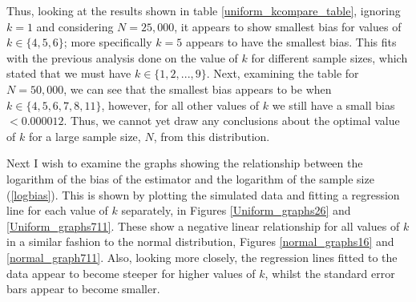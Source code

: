 \documentclass[12pt]{report}
\begin{document}
Thus, looking at the results shown in table \ref{uniform_kcompare_table}, ignoring $k=1$ and considering $N=25,000$, it appears to show smallest bias for values of $k \in \{4, 5, 6 \}$; more specifically $k=5$ appears to have the smallest bias. This fits with the previous analysis done on the value of $k$ for different sample sizes, which stated that we must have $k \in \{1, 2, ..., 9\}$. Next, examining the table for $N=50,000$, we can see that the smallest bias appears to be when $k \in \{ 4, 5, 6, 7, 8, 11\}$, however, for all other values of $k$ we still have a small bias $< 0.000012$. Thus, we cannot yet draw any conclusions about the optimal value of $k$ for a large sample size, $N$, from this distribution.

Next I wish to examine the graphs showing the relationship between the logarithm of the bias of the estimator and the logarithm of the sample size (\ref{logbias}). This is shown by plotting the simulated data and fitting a regression line for each value of $k$ separately, in Figures \ref{Uniform_graphs26} and \ref{Uniform_graphs711}. These show a negative linear relationship for all values of $k$ in a similar fashion to the normal distribution, Figures \ref{normal_graphs16} and \ref{normal_graph711}. Also, looking more closely, the regression lines fitted to the data appear to become steeper for higher values of $k$, whilst the standard error bars appear to become smaller. 
\end{document}

